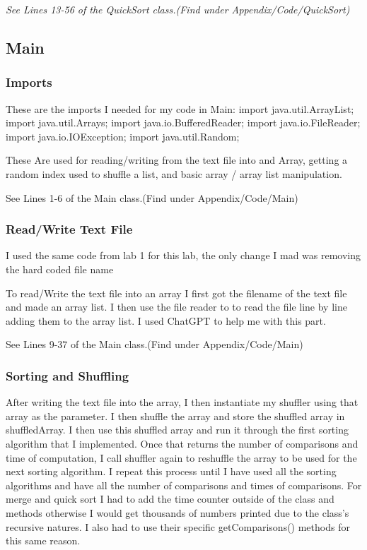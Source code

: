 \documentclass[10pt]{article}
\begin{document}
\emph{\normalfont
See Lines 13-56 of the QuickSort class.(Find under Appendix/Code/QuickSort)}

\subsection{Main}\label{operations}

\subsubsection{Imports}

These are the imports I needed for my code in Main:
\newline
import java.util.ArrayList;
\newline
import java.util.Arrays;
\newline
import java.io.BufferedReader;
\newline
import java.io.FileReader;
\newline
import java.io.IOException;
\newline
import java.util.Random;

These Are used for reading/writing from the text file into and Array, getting a random index used to shuffle a list, and basic array / array list manipulation.

See Lines 1-6 of the Main class.(Find under Appendix/Code/Main)

\subsubsection{Read/Write Text File}
I used the same code from lab 1 for this lab, the only change I mad was removing the hard coded file name

To read/Write the text file into an array I first got the filename of the text file and made an array list. I then use the file reader to to read the file line by line adding them to the array list. I used ChatGPT to help me with this part.

See Lines 9-37 of the Main class.(Find under Appendix/Code/Main)

\subsubsection{Sorting and Shuffling}

After writing the text file into the array, I then instantiate my shuffler using that array as the parameter. I then shuffle the array and store the shuffled array in shuffledArray. I then use this shuffled array and run it through the first sorting algorithm that I implemented. Once that returns the number of comparisons and time of computation, I call shuffler again to reshuffle the array to be used for the next sorting algorithm. I repeat this process until I have used all the sorting algorithms and have all the number of comparisons and times of comparisons. For merge and quick sort I had to add the time counter outside of the class and methods otherwise I would get thousands of numbers printed due to the class's recursive natures. I also had to use their specific getComparisons() methods for this same reason.
\end{document}
